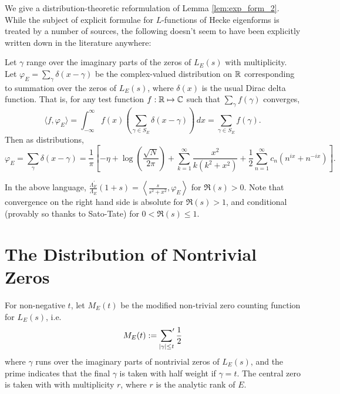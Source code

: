 \documentclass[10pt]{article}
\newcommand{\pr}{^{\prime}}
\newcommand{\Les}{L_E(s)}
\newcommand{\ldLam}[1]{\frac{\Lambda_E\pr}{\Lambda_E}\left(#1\right)}
\begin{document}
We give a distribution-theoretic reformulation of Lemma \ref{lem:exp_form_2}. While the subject of explicit formulae for $L$-functions of Hecke eigenforms is treated by a number of sources, the following doesn't seem to have been explicitly written down in the literature anywhere:
\begin{proposition}[S.]
Let $\gamma$ range over the imaginary parts of the zeros of $\Les$ with multiplicity. Let $\varphi_E = \sum_{\gamma} \delta(x-\gamma)$ be the complex-valued distribution on $\mathbb{R}$ corresponding to summation over the zeros of $L_E(s)$, where $\delta(x)$ is the usual Dirac delta function. That is, for any test function $f: \mathbb{R} \mapsto \mathbb{C}$ such that $\sum_{\gamma}f(\gamma)$ converges, 
\begin{equation}
\langle f,\varphi_E \rangle = \int_{-\infty}^{\infty} f(x)\left(\sum_{\gamma\in S_E} \delta(x-\gamma)\right) \, dx = \sum_{\gamma\in S_E} f(\gamma).
\end{equation}
Then as distributions,
\begin{equation}\label{eqn:exp_form_3}
\varphi_E = \sum_{\gamma} \delta(x-\gamma) = \frac{1}{\pi}\left[-\eta + \log\left(\frac{\sqrt{N}}{2\pi}\right) +\sum_{k=1}^{\infty} \frac{x^2}{k(k^2+x^2)} + \frac{1}{2}\sum_{n=1}^{\infty} c_n \left(n^{ix}+n^{-ix}\right) \right].
\end{equation}
\end{proposition}
In the above language, $\ldLam{1+s} = \left\langle \frac{s}{s^2+x^2},\varphi_E \right\rangle$ for $\Re(s) > 0$. Note that convergence on the right hand side is absolute for $\Re(s)>1$, and conditional (provably so thanks to Sato-Tate) for $0<\Re(s)\le 1$. \\

\newpage
\section{The Distribution of Nontrivial Zeros}

\begin{definition}
For non-negative $t$, let $M_E(t)$ be the modified non-trivial zero counting function for $\Les$, i.e.
\begin{equation}
M_E(t) := \sideset{}{\pr}\sum_{|\gamma| \le t} \frac{1}{2}
\end{equation}
where $\gamma$ runs over the imaginary parts of nontrivial zeros of $L_E(s)$, and the prime indicates that the final $\gamma$ is taken with half weight if $\gamma = t$. The central zero is taken with with multiplicity $r$, where $r$ is the analytic rank of $E$. \\
\end{definition}
\end{document}
